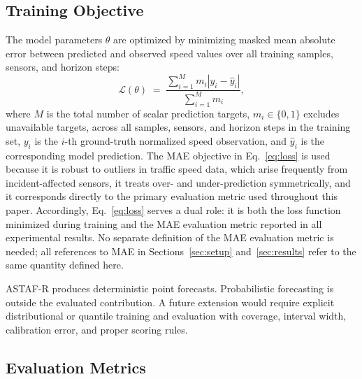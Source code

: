 \documentclass[fleqn,10pt]{wlscirep}
\newcommand{\chg}[1]{{\color{changeblue}#1}}
\newenvironment{changedcontent}{\color{changeblue}}{}
\begin{document}
\subsection{Training Objective}

The model parameters $\theta$ are optimized by minimizing
\chg{masked mean absolute error between predicted and observed
speed values} over all training samples, sensors,
and horizon steps:
%
\begin{equation}
    \mathcal{L}(\theta)
    \;=\; \frac{\sum_{i=1}^{M}m_i
    \left| y_i - \hat{y}_i \right|}
    {\sum_{i=1}^{M}m_i},
    \label{eq:loss}
\end{equation}
%
where $M$ is the total number of scalar prediction targets,
\chg{$m_i\in\{0,1\}$ excludes unavailable targets,}
across all samples, sensors, and horizon steps in the
training set, $y_i$ is the $i$-th ground-truth normalized
speed observation, and $\hat{y}_i$ is the corresponding
model prediction. The MAE objective in Eq.~\eqref{eq:loss}
is used because it is robust to outliers in traffic speed
data, which arise frequently from incident-affected sensors,
it treats over- and under-prediction symmetrically, and
it corresponds directly to the primary evaluation metric
used throughout this paper. Accordingly,
Eq.~\eqref{eq:loss} serves a dual role: it is both the
loss function minimized during training and the MAE
evaluation metric reported in all experimental results.
No separate definition of the MAE evaluation metric is
needed; all references to MAE in Sections~\ref{sec:setup}
and~\ref{sec:results} refer to the same quantity defined
here.

\begin{changedcontent}
ASTAF-R produces deterministic point forecasts. Probabilistic forecasting is
outside the evaluated contribution. A future extension would require explicit
distributional or quantile training and evaluation with coverage, interval
width, calibration error, and proper scoring rules.
\end{changedcontent}

\subsection{Evaluation Metrics}
\label{subsec:metrics}
\end{document}
